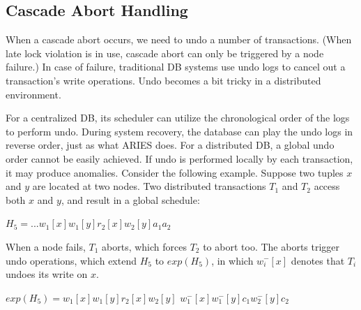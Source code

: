 \documentclass[conference]{IEEEtran}
\begin{document}
\subsection{Cascade Abort Handling}
When a cascade abort occurs,
we need to undo a number of transactions.
(When late lock violation is in use, cascade abort can only be triggered by a node failure.)
In case of failure, traditional DB systems use undo logs to cancel out a transaction's write operations.
Undo becomes a bit tricky in a distributed environment.

For a centralized DB, its scheduler can utilize the chronological order of the logs to perform undo.
During system recovery, the database can play the undo logs in reverse order, just as what ARIES \cite{ARIES:journals/tods/MohanHLPS92} does.
For a distributed DB, a global undo order cannot be easily achieved.
If undo is performed locally by each transaction, it may produce anomalies.
Consider the following example. Suppose two tuples $x$ and $y$ are located at two nodes.
Two distributed transactions $T_1$ and $T_2$ access both $x$ and $y$, and result in a global schedule:

\begin{center}
${H_5 = ...w_1[x]w_1[y]r_2[x]w_2[y]a_1a_2}$
\end{center}

When a node fails, ${T_1}$ aborts, which forces ${T_2}$ to abort too.
The aborts trigger undo operations, which extend ${H_5}$ to ${exp(H_5)}$,
in which ${w^-_i[x]}$ denotes that ${T_i}$ undoes its write on ${x}$.

\begin{center}
  ${exp(H_5) =  w_1[x]w_1[y]r_2[x] w_2[y]}$
  ${w^-_1[x]w^-_1[y]  c_1 w^-_2[y]c_2}$
\end{center}
\end{document}
